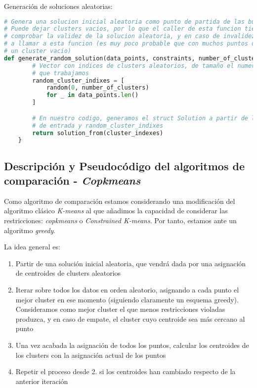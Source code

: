 \documentclass[11pt]{article}
\begin{document}
Generación de soluciones aleatorias:

\begin{lstlisting}[language=Python, style=Boxed]
# Genera una solucion inicial aleatoria como punto de partida de las busquedas
# Puede dejar clusters vacios, por lo que el caller de esta funcion tiene que
# comprobar la validez de la solucion aleatoria, y en caso de invalidez, volver
# a llamar a esta funcion (es muy poco probable que con muchos puntos dejemos
# un cluster vacio)
def generate_random_solution(data_points, constraints, number_of_clusters):
        # Vector con indices de clusters aleatorios, de tamaño el numero de puntos
        # que trabajamos
        random_cluster_indixes = [
            random(0, number_of_clusters)
            for _ in data_points.len()
        ]

        # En nuestro codigo, generamos el struct Solution a partir de los parametros
        # de entrada y random_cluster_indixes
        return solution_from(cluster_indexes)
    }
    \end{lstlisting}


    \pagebreak

    \subsection{Descripción y Pseudocódigo del algoritmos de comparación - \emph{Copkmeans}}

    Como algoritmo de comparación estamos considerando una modificación del algoritmo clásico \emph{K-means} al que añadimos la capacidad de considerar las restricciones: \emph{copkmeans} o \emph{Constrained K-means}. Por tanto, estamos ante un algoritmo \emph{greedy}.

    La idea general es:

    \begin{enumerate}
        \item Partir de una solución inicial aleatoria, que vendrá dada por una asignación de centroides de clusters aleatorios
        \item Iterar sobre todos los datos en orden aleatorio, asignando a cada punto el mejor cluster en ese momento (siguiendo claramente un esquema greedy). Consideramos como mejor cluster el que menos restricciones violadas produzca, y en caso de empate, el cluster cuyo centroide sea más cercano al punto
        \item Una vez acabada la asignación de todos los puntos, calcular los centroides de los clusters con la asignación actual de los puntos
        \item Repetir el proceso desde 2. si los centroides han cambiado respecto de la anterior iteración
    \end{enumerate}
\end{document}
